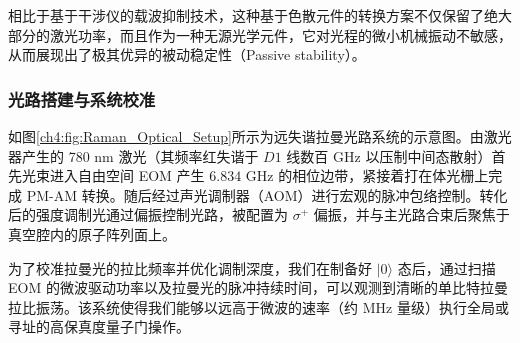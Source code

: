 \documentclass[../main.tex]{subfiles}
\begin{document}
相比于基于干涉仪的载波抑制技术，这种基于色散元件的转换方案不仅保留了绝大部分的激光功率，而且作为一种无源光学元件，它对光程的微小机械振动不敏感，从而展现出了极其优异的被动稳定性（Passive stability）。

\subsubsection{光路搭建与系统校准}
如图\ref{ch4:fig:Raman_Optical_Setup}所示为远失谐拉曼光路系统的示意图。由激光器产生的 780 nm 激光（其频率红失谐于 $D1$ 线数百 GHz 以压制中间态散射）首先光束进入自由空间 EOM 产生 $6.834\text{ GHz}$ 的相位边带，紧接着打在体光栅上完成 PM-AM 转换。随后经过声光调制器（AOM）进行宏观的脉冲包络控制。转化后的强度调制光通过偏振控制光路，被配置为 $\sigma^+$ 偏振，并与主光路合束后聚焦于真空腔内的原子阵列面上。

为了校准拉曼光的拉比频率并优化调制深度，我们在制备好 $|0\rangle$ 态后，通过扫描 EOM 的微波驱动功率以及拉曼光的脉冲持续时间，可以观测到清晰的单比特拉曼拉比振荡。该系统使得我们能够以远高于微波的速率（约 MHz 量级）执行全局或寻址的高保真度量子门操作。




\end{document}
